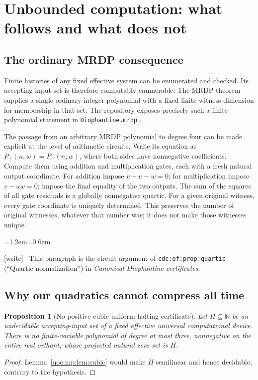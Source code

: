 \documentclass[11pt,letterpaper]{article}
\newtheorem{proposition}[theorem]{Proposition}
\theoremstyle{definition}
\theoremstyle{remark}
\newcommand{\N}{\mathbb N}
\newcommand{\wtag}{\textup{[write]}}
\newenvironment{writenote}{\par\smallskip\begin{list}{}{\leftmargin=1.2em\rightmargin=0.6em}\item[]\small\wtag\ }{\end{list}\smallskip}
\newcommand{\lab}[1]{\nolinkurl{#1}}
\begin{document}
\section{Unbounded computation: what follows and what does not}\label{qoc:mp:sec:unbounded}
\subsection{The ordinary MRDP consequence}
Finite histories of any fixed effective system can be enumerated and
checked. Its accepting-input set is therefore computably enumerable.
The MRDP theorem supplies a single ordinary integer polynomial with a
fixed finite witness dimension for membership in that set. The repository
exposes precisely such a finite-polynomial statement in
\texttt{Diophantine.mrdp} \cite{mp:repo-mrdp}.

The passage from an arbitrary MRDP polynomial to degree four can be made
explicit at the level of arithmetic circuits. Write its equation as
$P_+(n,w)=P_-(n,w)$, where both sides have nonnegative coefficients. Compute
them using addition and multiplication gates, each with a fresh natural
output coordinate. For addition impose $v-u-w=0$; for multiplication
impose $v-uw=0$; impose the final equality of the two outputs. The sum of
the squares of all gate residuals is a globally nonnegative quartic.
For a given original witness, every gate coordinate is uniquely
determined. This preserves the number of original witnesses, whatever
that number was; it does not make those witnesses unique.

\begin{writenote}
This paragraph is the circuit argument of \lab{cdc:of:prop:quartic} (``Quartic normalization'') in \emph{Canonical Diophantine certificates}.
\end{writenote}

\subsection{Why our quadratics cannot compress all time}
\begin{proposition}[No positive cubic uniform halting certificate]\label{qoc:mp:prop:unboundedbarrier}
Let $H\subseteq\N$ be an undecidable accepting-input set of a fixed
effective universal computational device. There is no finite-variable
polynomial of degree at most three, nonnegative on the entire real
orthant, whose projected natural zero set is $H$.
\end{proposition}
\begin{proof}
Lemma~\ref{qoc:mp:lem:cubic} would make $H$ semilinear and hence decidable,
contrary to the hypothesis.
\end{proof}
\end{document}
